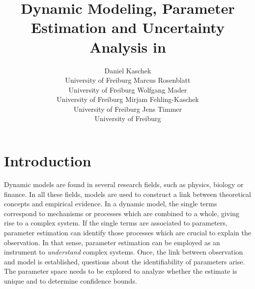 \documentclass[article]{jss}
\author{Daniel Kaschek\\University of Freiburg \And
	Marcus Rosenblatt\\University of Freiburg \AND
	Wolfgang Mader\\University of Freiburg \And
	Mirjam Fehling-Kaschek\\University of Freiburg \And
	Jens Timmer\\University of Freiburg}
\title{Dynamic Modeling, Parameter Estimation and Uncertainty Analysis in \proglang{R}}
\begin{document}
\section{Introduction}
Dynamic models are found in several research fields, such as physics, biology or finance. In all these fields, models are used to construct a link between theoretical concepts and empirical evidence. In a dynamic model, the single terms correspond to mechanisms or processes which are combined to a whole, giving rise to a complex system. If the single terms are associated to parameters, parameter estimation can identify those processes which are crucial to explain the observation. In that sense, parameter estimation can be employed as an instrument to \textit{understand} complex systems. Once, the link between observation and model is established, questions about the identifiability of parameters arise. The parameter space needs to be explored to analyze whether the estimate is unique and to determine confidence bounds.
\end{document}
